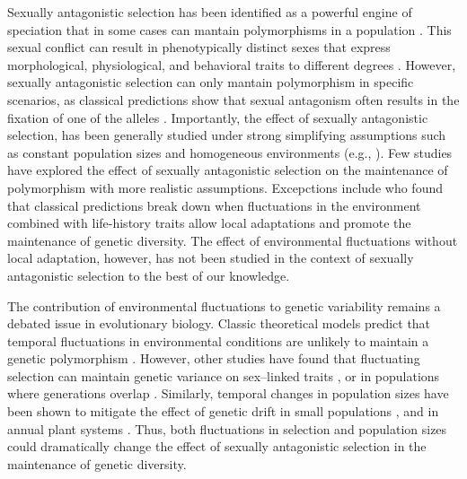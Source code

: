 \documentclass[12pt]{article}
\begin{document}
Sexually antagonistic selection has been identified as a powerful engine of speciation that in some cases can mantain polymorphisms  in a population \citep{gavrilets2014sexual}. This sexual conflict can result in phenotypically distinct sexes that express   morphological, physiological, and behavioral traits to different degrees \citep{mori2017sexual,connallon2018environmental}. However,  sexually antagonistic selection can only mantain polymorphism in specific scenarios, as classical predictions show that sexual antagonism often results in the fixation of one of the alleles \citep{connallon_evolutionary_2018}. Importantly, the effect of sexually antagonistic selection, has been generally studied under strong simplifying assumptions such as constant population sizes and homogeneous environments (e.g., \citet{kidwell1977regions, pamilo1979genic, immler2012ploidally}). Few studies have explored the effect of sexually antagonistic selection on the maintenance of polymorphism with more realistic assumptions. Excepctions include \citet{connallon_evolutionary_2018} who found that classical predictions break down when fluctuations in the environment combined with life-history traits allow local adaptations and promote the maintenance of genetic diversity. The effect of environmental fluctuations without local adaptation, however, has not been studied in the context of sexually antagonistic selection to the best of our knowledge.


The contribution of environmental fluctuations to genetic variability remains a debated issue in evolutionary biology. Classic theoretical models predict that temporal fluctuations in environmental conditions are unlikely to maintain a genetic polymorphism \citep{hedrick1974genetic,hedrick1986genetic}. However, other studies have found that fluctuating selection can maintain genetic variance on sex--linked traits \citep{reinhold2000maintenance}, or in populations where generations overlap \citep{ellner1994role, ellner1996patterns}. Similarly, temporal changes in population sizes have been shown to mitigate the effect of genetic drift in small populations \citep{pemberton1996maintenance}, and in annual plant systems \citep{nunney2002effective}. Thus, both fluctuations in selection and population sizes could dramatically change the effect of sexually antagonistic selection in the maintenance of genetic diversity.
\end{document}
